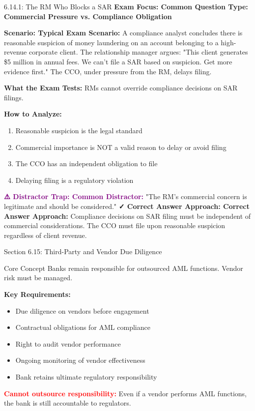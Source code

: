 \documentclass[11pt,a4paper]{beamer}
\newcommand{\redflag}[1]{\textcolor{red}{\textbf{#1}}}
\newcommand{\examfocus}[1]{\textcolor{orange!80!black}{\textbf{Exam Focus: #1}}}
\newcommand{\trap}[1]{\textcolor{purple}{\textbf{⚠️ Distractor Trap: #1}}}
\newcommand{\correct}[1]{\textcolor{green!50!black}{\textbf{✓ Correct Answer Approach: #1}}}
\newcommand{\scenario}[1]{\textcolor{blue!70!black}{\textbf{Scenario: #1}}}
\begin{document}
	\begin{frame}{6.14.1: The RM Who Blocks a SAR}
		\examfocus{Common Question Type: Commercial Pressure vs. Compliance Obligation}
		
		\scenario{Typical Exam Scenario:}
		A compliance analyst concludes there is reasonable suspicion of money laundering on an account belonging to a high-revenue corporate client. The relationship manager argues: "This client generates \$5 million in annual fees. We can't file a SAR based on suspicion. Get more evidence first." The CCO, under pressure from the RM, delays filing.
		
		\textbf{What the Exam Tests:} RMs cannot override compliance decisions on SAR filings.
		
		\textbf{How to Analyze:}
		\begin{enumerate}
			\item Reasonable suspicion is the legal standard
			\item Commercial importance is NOT a valid reason to delay or avoid filing
			\item The CCO has an independent obligation to file
			\item Delaying filing is a regulatory violation
		\end{enumerate}
		
		\trap{Common Distractor:} "The RM's commercial concern is legitimate and should be considered."
		\correct{Correct Answer Approach:} Compliance decisions on SAR filing must be independent of commercial considerations. The CCO must file upon reasonable suspicion regardless of client revenue.
	\end{frame}
	
	
	\begin{frame}{Section 6.15: Third-Party and Vendor Due Diligence}
		\begin{block}{Core Concept}
			Banks remain responsible for outsourced AML functions. Vendor risk must be managed.
		\end{block}
		\textbf{Key Requirements:}
		\begin{itemize}
			\item Due diligence on vendors before engagement
			\item Contractual obligations for AML compliance
			\item Right to audit vendor performance
			\item Ongoing monitoring of vendor effectiveness
			\item Bank retains ultimate regulatory responsibility
		\end{itemize}
		\redflag{Cannot outsource responsibility:} Even if a vendor performs AML functions, the bank is still accountable to regulators.
	\end{frame}
	
\end{document}
